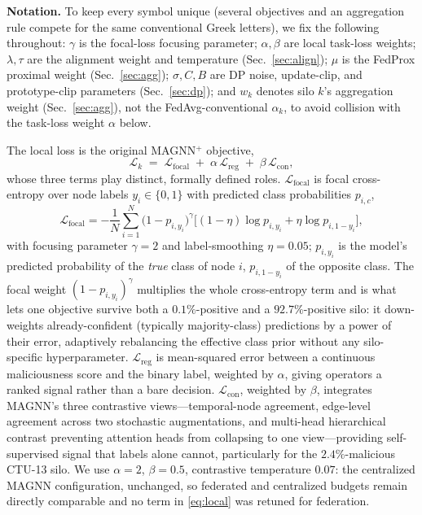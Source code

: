 \documentclass[journal]{IEEEtran}
\begin{document}
\textbf{Notation.} To keep every symbol unique (several objectives and
an aggregation rule compete for the same conventional Greek letters),
we fix the following throughout: $\gamma$ is the focal-loss focusing
parameter; $\alpha, \beta$ are local task-loss weights; $\lambda, \tau$
are the alignment weight and temperature (Sec.~\ref{sec:align});
$\mu$ is the FedProx proximal weight (Sec.~\ref{sec:agg}); $\sigma, C,
B$ are DP noise, update-clip, and prototype-clip parameters
(Sec.~\ref{sec:dp}); and $w_k$ denotes silo $k$'s aggregation weight
(Sec.~\ref{sec:agg}), not the FedAvg-conventional $\alpha_k$, to avoid
collision with the task-loss weight $\alpha$ below.

The local loss is the original MAGNN$^{+}$ objective,
\begin{equation}
\mathcal{L}_k \;=\; \mathcal{L}_{\mathrm{focal}}
 \;+\; \alpha\,\mathcal{L}_{\mathrm{reg}}
 \;+\; \beta\,\mathcal{L}_{\mathrm{con}},
\label{eq:local}
\end{equation}
whose three terms play distinct, formally defined roles.
$\mathcal{L}_{\mathrm{focal}}$ is focal cross-entropy over node labels
$y_i \in \{0,1\}$ with predicted class probabilities $p_{i,c}$,
\begin{equation}
\mathcal{L}_{\mathrm{focal}} = -\frac{1}{N}\sum_{i=1}^{N}
\big(1 - p_{i,y_i}\big)^{\gamma}
\Big[(1-\eta)\log p_{i,y_i} + \eta\log p_{i,1-y_i}\Big],
\label{eq:focal}
\end{equation}
with focusing parameter $\gamma{=}2$ and label-smoothing
$\eta{=}0.05$; $p_{i,y_i}$ is the model's predicted probability of the
\emph{true} class of node $i$, $p_{i,1-y_i}$ of the opposite class.
The focal weight $(1-p_{i,y_i})^{\gamma}$ multiplies the whole
cross-entropy term and is what lets one objective survive both a
$0.1\%$-positive and a $92.7\%$-positive silo: it down-weights
already-confident (typically majority-class) predictions by a power
of their error, adaptively rebalancing the effective class prior
without any silo-specific hyperparameter. $\mathcal{L}_{\mathrm{reg}}$
is mean-squared error between a continuous maliciousness score and the
binary label, weighted by $\alpha$, giving operators a ranked signal
rather than a bare decision. $\mathcal{L}_{\mathrm{con}}$, weighted by
$\beta$, integrates MAGNN's three contrastive views---temporal-node
agreement, edge-level agreement across two stochastic augmentations,
and multi-head hierarchical contrast preventing attention heads from
collapsing to one view---providing self-supervised signal that labels
alone cannot, particularly for the $2.4\%$-malicious CTU-13 silo. We
use $\alpha{=}2$, $\beta{=}0.5$, contrastive temperature $0.07$: the
centralized MAGNN configuration, unchanged, so federated and
centralized budgets remain directly comparable and no term in
\eqref{eq:local} was retuned for federation.
\end{document}
